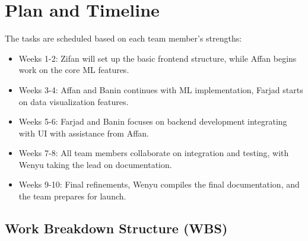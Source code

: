 \documentclass[12pt]{article}
\begin{document}
\section{Plan and Timeline}
The tasks are scheduled based on each team member's strengths:

\begin{itemize}
    \item Weeks 1-2: Zifan will set up the basic frontend structure, while Affan begins work on the core ML features.
    \item Weeks 3-4: Affan and Banin continues with ML implementation, Farjad starts on data visualization features.
    \item Weeks 5-6: Farjad and Banin focuses on backend development integrating with UI with assistance from Affan.
    \item Weeks 7-8: All team members collaborate on integration and testing, with Wenyu taking the lead on documentation.
    \item Weeks 9-10: Final refinements, Wenyu compiles the final documentation, and the team prepares for launch.
\end{itemize}


\subsection{Work Breakdown Structure (WBS)}
\end{document}
